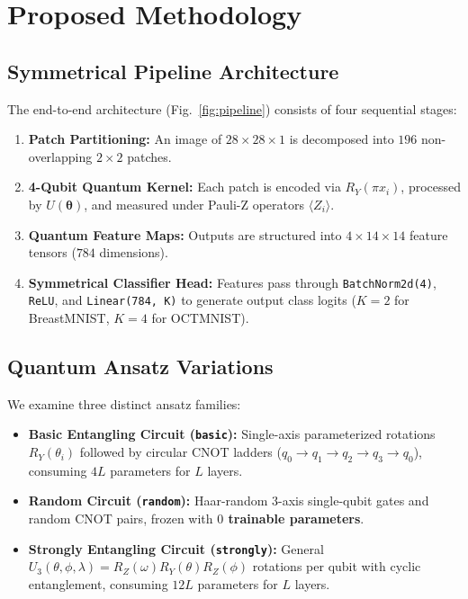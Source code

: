 \documentclass[runningheads]{llncs}
\begin{document}
\section{Proposed Methodology}

\subsection{Symmetrical Pipeline Architecture}
The end-to-end architecture (Fig.~\ref{fig:pipeline}) consists of four sequential stages:
\begin{enumerate}
    \item \textbf{Patch Partitioning:} An image of $28 \times 28 \times 1$ is decomposed into $196$ non-overlapping $2 \times 2$ patches.
    \item \textbf{4-Qubit Quantum Kernel:} Each patch is encoded via $R_Y(\pi x_i)$, processed by $U(\boldsymbol{\theta})$, and measured under Pauli-Z operators $\langle Z_i \rangle$.
    \item \textbf{Quantum Feature Maps:} Outputs are structured into $4 \times 14 \times 14$ feature tensors ($784$ dimensions).
    \item \textbf{Symmetrical Classifier Head:} Features pass through \texttt{BatchNorm2d(4)}, \texttt{ReLU}, and \texttt{Linear(784, K)} to generate output class logits ($K=2$ for BreastMNIST, $K=4$ for OCTMNIST).
\end{enumerate}

\subsection{Quantum Ansatz Variations}
We examine three distinct ansatz families:
\begin{itemize}
    \item \textbf{Basic Entangling Circuit (\texttt{basic}):} Single-axis parameterized rotations $R_Y(\theta_i)$ followed by circular CNOT ladders ($q_0 \to q_1 \to q_2 \to q_3 \to q_0$), consuming $4L$ parameters for $L$ layers.
    \item \textbf{Random Circuit (\texttt{random}):} Haar-random 3-axis single-qubit gates and random CNOT pairs, frozen with \textbf{$0$ trainable parameters}.
    \item \textbf{Strongly Entangling Circuit (\texttt{strongly}):} General $U_3(\theta, \phi, \lambda) = R_Z(\omega) R_Y(\theta) R_Z(\phi)$ rotations per qubit with cyclic entanglement, consuming $12L$ parameters for $L$ layers.
\end{itemize}
\end{document}
